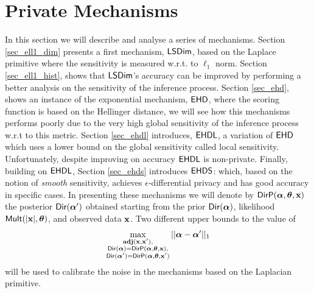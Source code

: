 \documentclass{article}
\begin{document}
\section{Private Mechanisms}
\label{sec_mechs}
In this section we will describe and analyse a series of mechanisms.
Section \ref{sec_ell1_dim} presents a first mechanism, $\mathsf{LSDim}$,
based on the Laplace primitive where the sensitivity is measured w.r.t. to $\ell_1$ norm.
Section \ref{sec_ell1_hist}, shows that $\mathsf{LSDim}$'s accuracy can be improved
by performing a better analysis on the sensitivity of the inference process.
Section \ref{sec_ehd}, shows an instance of the exponential mechanism, $\mathsf{EHD}$, where the scoring
function is based on the Hellinger distance, we will see how this mechanisms performs
poorly due to the very high global sensitivity of the inference process w.r.t to this metric.
Section \ref{sec_ehdl} introduces, $\mathsf{EHDL}$, a variation of $\mathsf{EHD}$ which uses a lower bound
on the global sensitivity called local sensitivity.
Unfortunately, despite improving on accuracy $\mathsf{EHDL}$ is non-private.
Finally, building on $\mathsf{EHDL}$, Section \ref{sec_ehds} introduces $\mathsf{EHDS}$:
which, based on the notion of \emph{smooth} sensitivity, achieves $\epsilon$-differential privacy and
has good accuracy in specific cases.
In presenting these mechanisms we will denote by $\mathsf{DirP}(\boldsymbol{\alpha},\boldsymbol{\theta},\textbf{x})$ the posterior  $\mathsf{Dir}(\boldsymbol{\alpha}')$
obtained starting from the prior $\mathsf{Dir}(\boldsymbol{\alpha})$, likelihood $\mathsf{Mult}(|\textbf{x}|, \boldsymbol{\theta})$, and observed data $\textbf{x}$.
Two different upper bounds to the value of
\begin{align}
  \label{eqn:eq1}
  \max_{\substack{\textbf{adj}(\textbf{x},\textbf{x}'),\\
      \mathsf{Dir}(\boldsymbol{\alpha})=\mathsf{DirP}(\boldsymbol{\alpha},\boldsymbol{\theta},\textbf{x}),\\
      \mathsf{Dir}(\boldsymbol{\alpha}')=\mathsf{DirP}(\boldsymbol{\alpha},\boldsymbol{\theta},\textbf{x}')}}||\boldsymbol{\alpha}-\boldsymbol{\alpha}'||_1 
\end{align}
will be used to calibrate the noise in the mechanisms based on the Laplacian primitive.
\end{document}
